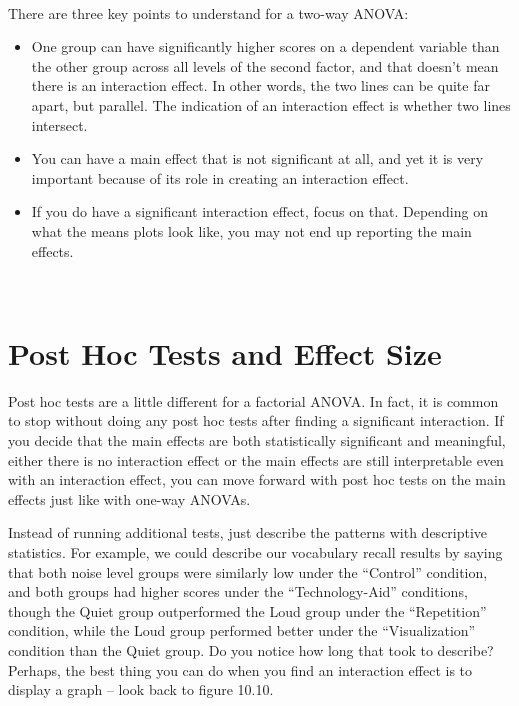 \documentclass[
  letterpaper,
  DIV=11,
  numbers=noendperiod]{scrreprt}
\begin{document}
\,

There are three key points to understand for a two-way ANOVA:\,

\begin{itemize}
\item
  One group can have significantly higher scores on a dependent variable
  than the other group across all levels of the second factor, and that
  doesn't mean there is an interaction effect. In other words, the two
  lines can be quite far apart, but parallel. The indication of an
  interaction effect is whether two lines intersect.\,\,
\item
  You can have a main effect that is not significant at all, and yet it
  is very important because of its role in creating an interaction
  effect.\,\,
\item
  If you do have a significant interaction effect, focus on that.
  Depending on what the means plots look like, you may not end up
  reporting the main effects.\,\,
\end{itemize}

\,

\section{Post Hoc Tests and Effect
Size\,}\label{post-hoc-tests-and-effect-size}

Post hoc tests are a little different for a factorial ANOVA. In fact, it
is common to stop without doing any post hoc tests after finding a
significant interaction. If you decide that the main effects are both
statistically significant and meaningful, either there is no interaction
effect or the main effects are still interpretable even with an
interaction effect, you can move forward with post hoc tests on the main
effects just like with one-way ANOVAs.\,\,

Instead of running additional tests, just describe the patterns with
descriptive statistics. For example, we could describe our vocabulary
recall results by saying that both noise level groups were similarly low
under the ``Control'' condition, and both groups had higher scores under
the ``Technology-Aid'' conditions, though the Quiet group outperformed
the Loud group under the ``Repetition'' condition, while the Loud group
performed better under the ``Visualization'' condition than the Quiet
group. Do you notice how long that took to describe? Perhaps, the best
thing you can do when you find an interaction effect is to display a
graph -- look back to figure 10.10.
\end{document}
